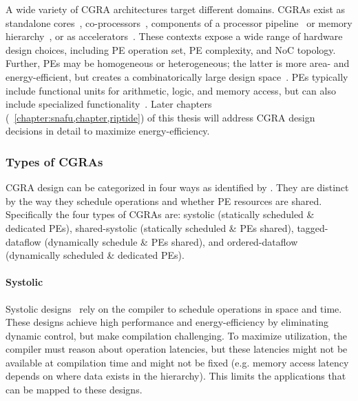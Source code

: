 A wide variety of CGRA architectures target different domains.
%
CGRAs exist as standalone cores~\cite{trips,raw,swanson2003wavescalar,mishra2006tartan},
co-processors~\cite{tan2018stitch,hauser1997garp,beret,seed,adres,charm,camel,goldstein2000piperench},
components of a processor pipeline~\cite{dyser,dynaspam,chimera}
or memory hierarchy~\cite{livia},
or as accelerators~\cite{plasticine,wave,gorgon,capstan,q100,nowatzki:isca17:stream-dataflow,weng2020hybrid,dadu2019towards,polygraph,taskstream,voitsechov2014single,nguyen2021fifer,morphosys,ppa,fpca}.
%
These contexts expose a wide range of hardware design choices, including PE
operation set, PE complexity, and NoC topology.
% 
Further, PEs may be homogeneous or heterogeneous; the latter is more area- and
energy-efficient, but creates a combinatorically large design space~\cite{revamp}.
% 
PEs typically include functional units for arithmetic, logic,
and memory access, but can also include 
specialized functionality~\cite{snafu,weng2020dsagen,dadu2019towards,q100,gorgon,capstan,polygraph,taskstream}.
% 
Later chapters (~\autoref{chapter:snafu,chapter,riptide}) of this thesis will address CGRA design decisions in detail to maximize energy-efficiency.

\subsubsection{Types of CGRAs}
CGRA design can be categorized in four ways as identified by \cite{weng2020hybrid}.
% 
They are distinct by the way they schedule operations and whether PE resources are shared.
% 
Specifically the four types of CGRAs are: systolic (statically scheduled \& dedicated PEs), shared-systolic (statically scheduled \& PEs shared),  tagged-dataflow (dynamically schedule \& PEs shared), and ordered-dataflow (dynamically scheduled \& dedicated PEs).

\paragraph{Systolic}
Systolic designs~\cite{tartan,piperench,fpca,warp,nowatzki:isca17:stream-dataflow} rely on the compiler to schedule operations in space and time.
% 
These designs achieve high performance and energy-efficiency by eliminating dynamic control, but make compilation challenging.
% 
To maximize utilization, the compiler must reason about operation latencies, but these latencies might not be available at compilation time and might not be fixed (e.g. memory access latency depends on where data exists in the hierarchy).
% 
This limits the applications that can be mapped to these designs.

